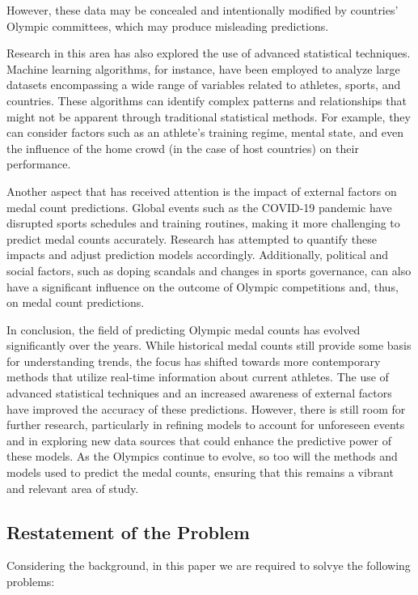 However, these data may be concealed and intentionally modified by countries' Olympic committees, which may produce misleading predictions.

Research in this area has also explored the use of advanced statistical techniques. Machine learning algorithms, for instance, have been employed to analyze large datasets encompassing a wide range of variables related to athletes, sports, and countries. These algorithms can identify complex patterns and relationships that might not be apparent through traditional statistical methods. For example, they can consider factors such as an athlete's training regime, mental state, and even the influence of the home crowd (in the case of host countries) on their performance.

Another aspect that has received attention is the impact of external factors on medal count predictions. Global events such as the COVID-19 pandemic have disrupted sports schedules and training routines, making it more challenging to predict medal counts accurately. Research has attempted to quantify these impacts and adjust prediction models accordingly. Additionally, political and social factors, such as doping scandals and changes in sports governance, can also have a significant influence on the outcome of Olympic competitions and, thus, on medal count predictions.

In conclusion, the field of predicting Olympic medal counts has evolved significantly over the years. While historical medal counts still provide some basis for understanding trends, the focus has shifted towards more contemporary methods that utilize real-time information about current athletes. The use of advanced statistical techniques and an increased awareness of external factors have improved the accuracy of these predictions. However, there is still room for further research, particularly in refining models to account for unforeseen events and in exploring new data sources that could enhance the predictive power of these models. As the Olympics continue to evolve, so too will the methods and models used to predict the medal counts, ensuring that this remains a vibrant and relevant area of study.

\subsection{Restatement of the Problem}
Considering the background, in this paper we are required to solvye the following problems:

